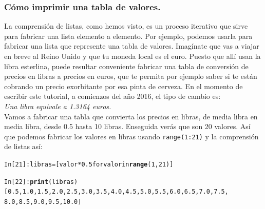 \documentclass[10pt,a4paper]{article}\usepackage[]{graphicx}\usepackage[]{color}
\makeatletter
\newcommand{\hlkwd}[1]{\textcolor[rgb]{0.737,0.353,0.396}{\textbf{#1}}}%
\newenvironment{kframe}{%
 \def\at@end@of@kframe{}%
 \ifinner\ifhmode%
  \def\at@end@of@kframe{\end{minipage}}%
  \begin{minipage}{\columnwidth}%
 \fi\fi%
 \def\FrameCommand##1{\hskip\@totalleftmargin \hskip-\fboxsep
 \colorbox{shadecolor}{##1}\hskip-\fboxsep
     \hskip-\linewidth \hskip-\@totalleftmargin \hskip\columnwidth}%
 \MakeFramed {\advance\hsize-\width
   \@totalleftmargin\z@ \linewidth\hsize
   \@setminipage}}%
 {\par\unskip\endMakeFramed%
 \at@end@of@kframe}
\newenvironment{knitrout}{}{} %
\makeatother
\begin{document}
\subsubsection*{Cómo imprimir una tabla de valores.}

La comprensión de listas, como hemos visto, es un proceso iterativo que sirve para fabricar una lista elemento a elemento. Por ejemplo, podemos usarla para fabricar una lista que represente una tabla de valores. Imagínate que vas a viajar en breve al Reino Unido y que tu moneda local es el euro. Puesto que allí usan la libra esterlina, puede resultar conveniente fabricar una tabla de conversión de precios en libras a precios en euros, que te permita por ejemplo saber si te están cobrando un precio exorbitante por esa pinta de cerveza. En el momento de escribir este tutorial, a comienzos del año 2016, el tipo de cambio es:\\

{\em Una libra equivale a 1.3164 euros.}\\

Vamos a fabricar una tabla que convierta los precios en libras, de media libra en media libra, desde 0.5 hasta 10 libras. Enseguida verás que son 20 valores. Así que podemos fabricar los valores en libras usando {\tt range(1:21)} y la comprensión de listas así:

\begin{knitrout}
\color{fgcolor}\begin{kframe}
\begin{alltt}
In [21]: libras = [valor * 0.5 for valor in \hlkwd{range}(1, 21)]

In [22]: \hlkwd{print}(libras)
[0.5, 1.0, 1.5, 2.0, 2.5, 3.0, 3.5, 4.0, 4.5, 5.0, 5.5, 6.0, 6.5, 7.0, 7.5,
8.0, 8.5, 9.0, 9.5, 10.0]
\end{alltt}
\end{kframe}
\end{knitrout}
\end{document}
